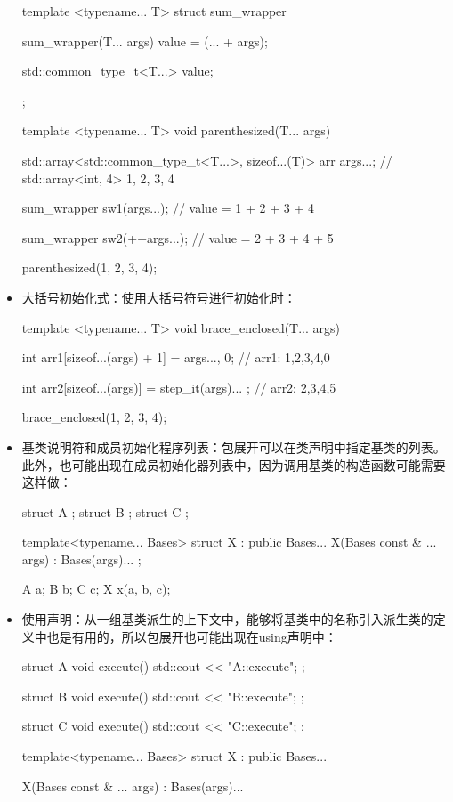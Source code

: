 \begin{itemize}
\begin{cpp}
template <typename... T>
struct sum_wrapper
{
	sum_wrapper(T... args)
	{
		value = (... + args);
	}

	std::common_type_t<T...> value;
};

template <typename... T>
void parenthesized(T... args)
{
	std::array<std::common_type_t<T...>,
	           sizeof...(T)> arr {args...};
	// std::array<int, 4> {1, 2, 3, 4}
	
	sum_wrapper sw1(args...);
	// value = 1 + 2 + 3 + 4
	
	sum_wrapper sw2(++args...);
	// value = 2 + 3 + 4 + 5
}
parenthesized(1, 2, 3, 4);
\end{cpp}

\item
大括号初始化式：使用大括号符号进行初始化时：

\begin{cpp}
template <typename... T>
void brace_enclosed(T... args)
{
	int arr1[sizeof...(args) + 1] = {args..., 0};
	// arr1: {1,2,3,4,0}
	
	int arr2[sizeof...(args)] = { step_it(args)... };
	// arr2: {2,3,4,5}
}

brace_enclosed(1, 2, 3, 4);
\end{cpp}

\item
基类说明符和成员初始化程序列表：包展开可以在类声明中指定基类的列表。此外，也可能出现在成员初始化器列表中，因为调用基类的构造函数可能需要这样做：

\begin{cpp}
struct A {};
struct B {};
struct C {};

template<typename... Bases>
struct X : public Bases...
{
	X(Bases const & ... args) : Bases(args)...
	{ }
};

A a;
B b;
C c;
X x(a, b, c);
\end{cpp}

\item
使用声明：从一组基类派生的上下文中，能够将基类中的名称引入派生类的定义中也是有用的，所以包展开也可能出现在using声明中：

\begin{cpp}
struct A
{
	void execute() { std::cout << "A::execute\n"; }
};

struct B
{
	void execute() { std::cout << "B::execute\n"; }
};

struct C
{
	void execute() { std::cout << "C::execute\n"; }
};

template<typename... Bases>
struct X : public Bases...
{
	X(Bases const & ... args) : Bases(args)...
	{}
	
}
\end{cpp}
\end{itemize}
